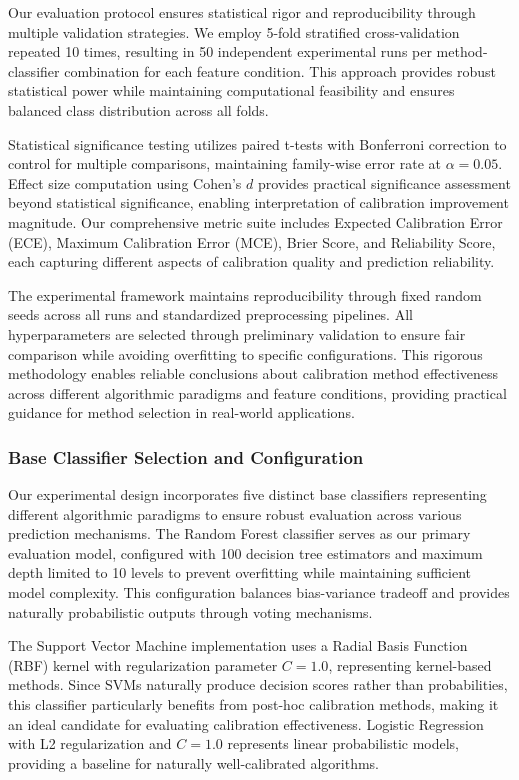 \documentclass[12pt, a4paper]{article}
\begin{document}
Our evaluation protocol ensures statistical rigor and reproducibility through multiple validation strategies. We employ 5-fold stratified cross-validation repeated 10 times, resulting in 50 independent experimental runs per method-classifier combination for each feature condition. This approach provides robust statistical power while maintaining computational feasibility and ensures balanced class distribution across all folds.

Statistical significance testing utilizes paired t-tests with Bonferroni correction to control for multiple comparisons, maintaining family-wise error rate at $\alpha = 0.05$. Effect size computation using Cohen's $d$ provides practical significance assessment beyond statistical significance, enabling interpretation of calibration improvement magnitude. Our comprehensive metric suite includes Expected Calibration Error (ECE), Maximum Calibration Error (MCE), Brier Score, and Reliability Score, each capturing different aspects of calibration quality and prediction reliability.

The experimental framework maintains reproducibility through fixed random seeds across all runs and standardized preprocessing pipelines. All hyperparameters are selected through preliminary validation to ensure fair comparison while avoiding overfitting to specific configurations. This rigorous methodology enables reliable conclusions about calibration method effectiveness across different algorithmic paradigms and feature conditions, providing practical guidance for method selection in real-world applications.

\subsubsection{Base Classifier Selection and Configuration}

Our experimental design incorporates five distinct base classifiers representing different algorithmic paradigms to ensure robust evaluation across various prediction mechanisms. The Random Forest classifier serves as our primary evaluation model, configured with 100 decision tree estimators and maximum depth limited to 10 levels to prevent overfitting while maintaining sufficient model complexity. This configuration balances bias-variance tradeoff and provides naturally probabilistic outputs through voting mechanisms.

The Support Vector Machine implementation uses a Radial Basis Function (RBF) kernel with regularization parameter $C = 1.0$, representing kernel-based methods. Since SVMs naturally produce decision scores rather than probabilities, this classifier particularly benefits from post-hoc calibration methods, making it an ideal candidate for evaluating calibration effectiveness. Logistic Regression with L2 regularization and $C = 1.0$ represents linear probabilistic models, providing a baseline for naturally well-calibrated algorithms.
\end{document}
